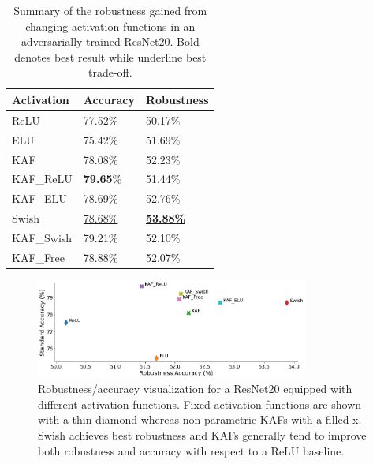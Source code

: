 \documentclass[LaM,binding=0.6cm]{./packages/sapthesis/sapthesis}
\begin{document}
        \begin{table}[!h]
            \centering
            \begin{tabular}{ |p{2.5cm}||p{1.7cm}|p{2.1cm}|  }
                \hline
                \textbf{Activation} & \textbf{Accuracy} & \textbf{Robustness}\\
                \hline
                ReLU & 77.52\% & 50.17\% \\
                ELU & 75.42\% & 51.69\% \\
                KAF & 78.08\% & 52.23\% \\
                KAF\_ReLU & \textbf{79.65}\% & 51.44\% \\
                KAF\_ELU & 78.69\% & 52.76\% \\
                Swish & \underline{78.68\%} & \underline{\textbf{53.88\%}} \\
                KAF\_Swish & 79.21\%& 52.10\% \\
                KAF\_Free & 78.88\%& 52.07\% \\
                \hline
            \end{tabular}
            \caption{Summary of the robustness gained from changing activation functions in an 
            adversarially trained ResNet20. Bold denotes best result while underline best trade-off.}
            \label{tab:resnetrob}
        \end{table}
        \begin{figure}[!h]
            \centering
            \includegraphics[width=0.8\textwidth]{rob_af2.png}
            \caption{Robustness/accuracy visualization for a ResNet20 equipped with different activation functions. 
            Fixed activation functions are shown with a thin diamond whereas non-parametric KAFs with a filled x. Swish achieves best robustness and KAFs generally tend 
            to improve both robustness and accuracy with respect to a ReLU baseline.}
            \label{fig:rob_af2}
        \end{figure}
\end{document}
